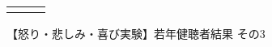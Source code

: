 \begin{figure}[h]
\begin{tabular}{ccc}
    \begin{minipage} {0.31\hsize}
    \centering
    \includegraphics [ width = 1\columnwidth]{Figure/Appendix/6C/AngHapSad_YNH/Fig_sh_MTK_hap-sad_Task1.eps }
    MTKの結果
    \end{minipage} &
    
    \begin{minipage} {0.31\hsize}
    \centering
    \includegraphics [ width = 1\columnwidth]{Figure/Appendix/6C/AngHapSad_YNH/Fig_ha_MTK_ang-hap_Task1.eps }
    　
    \end{minipage}
  
  
  \end{tabular}
  
  \vspace {-6pt}
  \caption{【怒り・悲しみ・喜び実験】若年健聴者結果 その3}
  

  \vspace {-12pt}
  \end{figure}

  \clearpage

